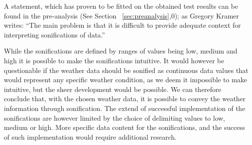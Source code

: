 A statement, which has proven to be fitted on the obtained test results can be found in the pre-analysis (See Section ~\ref{sec:preanalysis},0); as Gregory Kramer writes: \enquote{The main problem is that it is difficult to provide adequate context for interpreting sonifications of data.}

While the sonifications are defined by ranges of values being low, medium and high it is possible to make the sonifications intuitive. 
It would however be questionable if the weather data should be sonified as continuous data values that would represent any specific weather condition, as we deem it impossible to make intuitive, but the sheer development would be possible. 
We can therefore conclude that, with the chosen weather data, it is possible to convey the weather information through sonification. 
The extend of successful implementation of the sonifications are however limited by the choice of delimiting values to low, medium or high. 
More specific data content for the sonifications, and the success of such implementation would require additional research.

